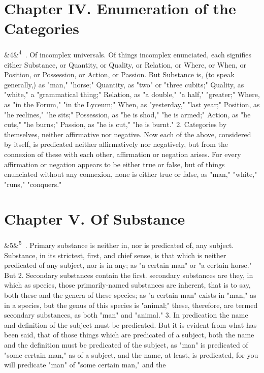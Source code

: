 \documentclass[12pt]{article}
\newcommand{\para}[1][]{\par\noindent\ifx&#1&\else\textsuperscript{\footnotesize #1}~\fi}
\begin{document}
\section*{Chapter IV. Enumeration of the Categories}

\para[4] 1. Of incomplex universals. Of things incomplex enunciated, each signifies either Substance, or Quantity, or Quality, or Relation, or Where, or When, or Position, or Possession, or Action, or Passion. But Substance is, (to speak generally,) as "man," "horse;" Quantity, as "two" or "three cubits;" Quality, as "white," a "grammatical thing;" Relation, as "a double," "a half," "greater;" Where, as "in the Forum," "in the Lyceum;" When, as "yesterday," "last year;" Position, as "he reclines," "he sits;" Possession, as "he is shod," "he is armed;" Action, as "he cuts," "he burns;" Passion, as "he is cut," "he is burnt." 2. Categories by themselves, neither affirmative nor negative. Now each of the above, considered by itself, is predicated neither affirmatively nor negatively, but from the connexion of these with each other, affirmation or negation arises. For every affirmation or negation appears to be either true or false, but of things enunciated without any connexion, none is either true or false, as "man," "white," "runs," "conquers."

\section*{Chapter V. Of Substance}

\para[5] 1. Primary substance is neither in, nor is predicated of, any subject. Substance, in its strictest, first, and chief sense, is that which is neither predicated of any subject, nor is in any; as "a certain man" or "a certain horse." But 2. Secondary substances contain the first. secondary substances are they, in which as species, those primarily-named substances are inherent, that is to say, both these and the genera of these species; as "a certain man" exists in "man," as in a species, but the genus of this species is "animal;" these, therefore, are termed secondary substances, as both "man" and "animal." 3. In predication the name and definition of the subject must be predicated. But it is evident from what has been said, that of those things which are predicated of a subject, both the name and the definition must be predicated of the subject, as "man" is predicated of "some certain man," as of a subject, and the name, at least, is predicated, for you will predicate "man" of "some certain man," and the
\end{document}
